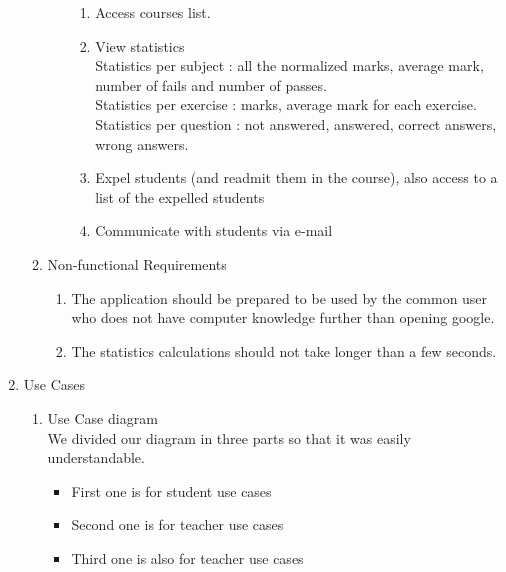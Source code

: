 \documentclass{article}
\renewcommand\labelitemi{$\cdot$ }
\begin{document}
\begin{enumerate}
\begin{enumerate}
\begin{enumerate}
\begin{enumerate}
				\item Access courses list.\\
				\item View statistics\\
				Statistics per subject : all the normalized marks, average mark, number of fails and number of passes.\\
				Statistics per exercise : marks, average mark for each exercise.\\
				Statistics per question : not answered, answered, correct answers, wrong answers.\\
				\item Expel students (and readmit them in the course), also access to a list of the expelled students\\
				\item Communicate with students via e-mail\\
				
				 
			\end{enumerate}
		\end{enumerate}
		\item{Non-functional Requirements}
			\begin{enumerate}
				\item The application should be prepared to be used by the common user who does not have computer knowledge further than opening google.
				\item The statistics calculations should not take longer than a few seconds.
			\end{enumerate}
	\end{enumerate}
	\newpage
	\item{Use Cases}
	\begin{enumerate}
		\item{Use Case diagram}
		\\
		We divided our diagram in three parts so that it was easily understandable.\\
		\begin{itemize}
			\renewcommand\labelitemi{$\star$}
			\item First one is for student use cases
			\item Second one is for teacher use cases
			\item Third one is also for teacher use cases \\ \\
		\end{itemize}
	

\end{enumerate}
\end{enumerate}
\end{document}
